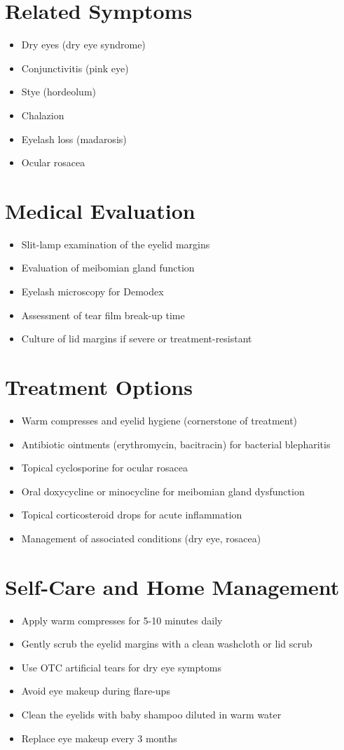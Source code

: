 \section*{Related Symptoms}
\begin{itemize}
\item Dry eyes (dry eye syndrome)
\item Conjunctivitis (pink eye)
\item Stye (hordeolum)
\item Chalazion
\item Eyelash loss (madarosis)
\item Ocular rosacea
\end{itemize}

\section*{Medical Evaluation}
\begin{itemize}
\item Slit-lamp examination of the eyelid margins
\item Evaluation of meibomian gland function
\item Eyelash microscopy for Demodex
\item Assessment of tear film break-up time
\item Culture of lid margins if severe or treatment-resistant
\end{itemize}

\section*{Treatment Options}
\begin{itemize}
\item Warm compresses and eyelid hygiene (cornerstone of treatment)
\item Antibiotic ointments (erythromycin, bacitracin) for bacterial blepharitis
\item Topical cyclosporine for ocular rosacea
\item Oral doxycycline or minocycline for meibomian gland dysfunction
\item Topical corticosteroid drops for acute inflammation
\item Management of associated conditions (dry eye, rosacea)
\end{itemize}
\section*{Self-Care and Home Management}
\begin{itemize}
\item Apply warm compresses for 5-10 minutes daily
\item Gently scrub the eyelid margins with a clean washcloth or lid scrub
\item Use OTC artificial tears for dry eye symptoms
\item Avoid eye makeup during flare-ups
\item Clean the eyelids with baby shampoo diluted in warm water
\item Replace eye makeup every 3 months
\end{itemize}

